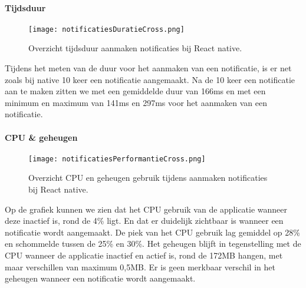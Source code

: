 \paragraph{Tijdsduur}
\begin{figure}[H]
  \centering
  \texttt{[image: notificatiesDuratieCross.png]}
  \caption{Overzicht tijdsduur aanmaken notificaties bij React native.}
\end{figure}
Tijdens het meten van de duur voor het aanmaken van een notificatie, is er net zoals bij native 
10 keer een notificatie aangemaakt. Na de 10 keer een notificatie aan te maken zitten we met 
een gemiddelde duur van 166ms en met een minimum en 
maximum van 141ms en 297ms voor het aanmaken van een notificatie.

\paragraph{CPU \& geheugen}
\begin{figure}[H]
  \centering
  \texttt{[image: notificatiesPerformantieCross.png]}
  \caption{Overzicht CPU en geheugen gebruik tijdens aanmaken notificaties bij React native.}
\end{figure}
Op de grafiek kunnen we zien dat het CPU gebruik van de applicatie wanneer deze inactief is, rond de 4\% ligt. 
En dat er duidelijk zichtbaar is wanneer een notificatie wordt aangemaakt. De piek van het CPU gebruik lag 
gemiddel op 28\% en schommelde tussen de 25\% en 30\%. Het geheugen blijft in tegenstelling met de CPU 
wanneer de applicatie inactief en actief is, rond de 172MB hangen, met maar verschillen van maximum 0,5MB. 
Er is geen merkbaar verschil in het geheugen wanneer een notificatie wordt aangemaakt.
